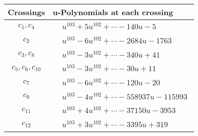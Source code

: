 \documentclass[1p]{elsarticle_modified}
\theoremstyle{definition}
\begin{document}
\begin{tabular}{m{50pt}|m{274pt}}
Crossings & \hspace{64pt}u-Polynomials at each crossing \\
\hline $$\begin{aligned}c_{1},c_{4}\end{aligned}$$&$\begin{aligned}
&u^{103}+5 u^{102}+\cdots-140 u-5
\end{aligned}$\\
\hline $$\begin{aligned}c_{2}\end{aligned}$$&$\begin{aligned}
&u^{103}-6 u^{102}+\cdots-2684 u-1763
\end{aligned}$\\
\hline $$\begin{aligned}c_{3},c_{8}\end{aligned}$$&$\begin{aligned}
&u^{103}-3 u^{102}+\cdots-340 u+41
\end{aligned}$\\
\hline $$\begin{aligned}c_{5},c_{6},c_{10}\end{aligned}$$&$\begin{aligned}
&u^{103}-3 u^{102}+\cdots-30 u+11
\end{aligned}$\\
\hline $$\begin{aligned}c_{7}\end{aligned}$$&$\begin{aligned}
&u^{103}-6 u^{102}+\cdots-120 u-20
\end{aligned}$\\
\hline $$\begin{aligned}c_{9}\end{aligned}$$&$\begin{aligned}
&u^{103}-4 u^{102}+\cdots-558937 u-115993
\end{aligned}$\\
\hline $$\begin{aligned}c_{11}\end{aligned}$$&$\begin{aligned}
&u^{103}+4 u^{102}+\cdots-37150 u-3953
\end{aligned}$\\
\hline $$\begin{aligned}c_{12}\end{aligned}$$&$\begin{aligned}
&u^{103}+3 u^{102}+\cdots-3395 u+319
\end{aligned}$\\
\hline
\end{tabular}\\~\\
\end{document}
